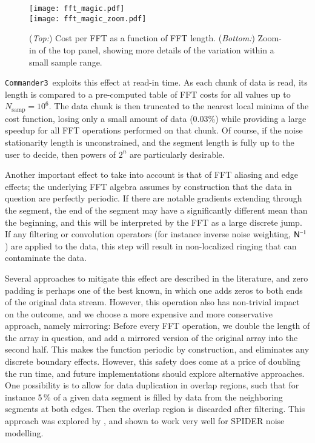 \documentclass[twocolumn]{aa}
\def\commanderthree{\texttt{Commander3}}
\newcommand{\N}[0]{\tens{N}}
\begin{document}
\begin{figure}[t]
  \center
  \texttt{[image: fft\_magic.pdf]}\\
  \texttt{[image: fft\_magic\_zoom.pdf]}
  \caption{(\emph{Top:}) Cost per FFT as a function of FFT
    length. (\emph{Bottom:}) Zoom-in of the top panel, showing more
    details of the variation within a small sample range.
  }\label{fig:fftw}
\end{figure}


\commanderthree\ exploits this effect at read-in time. As each chunk
of data is read, its length is compared to a pre-computed table of FFT
costs for all values up to $N_{\mathrm{samp}} = 10^6$. The data chunk
is then truncated to the nearest local minima of the cost function,
losing only a small amount of data (0.03\%) while providing a large
speedup for all FFT operations performed on that chunk. Of course, if
the noise stationarity length is unconstrained, and the segment length
is fully up to the user to decide, then powers of $2^{n}$ are
particularly desirable.

Another important effect to take into account is that of FFT aliasing
and edge effects; the underlying FFT algebra assumes by construction
that the data in question are perfectly periodic. If there are notable
gradients extending through the segment, the end of the segment may
have a significantly different mean than the beginning, and this will
be interpreted by the FFT as a large discrete jump. If any filtering
or convolution operators (for instance inverse noise weighting,
$\N^{-1}$) are applied to the data, this step will result in
non-localized ringing that can contaminate the data.

Several approaches to mitigate this effect are described in the
literature, and zero padding is perhaps one of the best known, in
which one adds zeros to both ends of the original data
stream. However, this operation also has non-trivial impact on the
outcome, and we choose a more expensive and more conservative
approach, namely mirroring: Before every FFT operation, we double the
length of the array in question, and add a mirrored version of the
original array into the second half. This makes the function periodic
by construction, and eliminates any discrete boundary
effects. However, this safety does come at a price of doubling the run
time, and future implementations should explore alternative
approaches. One possibility is to allow for data duplication in
overlap regions, such that for instance 5\,\% of a given data segment
is filled by data from the neighboring segments at both edges. Then
the overlap region is discarded after filtering. This approach was
explored by \citet{thesis}, and shown to work
very well for SPIDER noise modelling.
\end{document}
